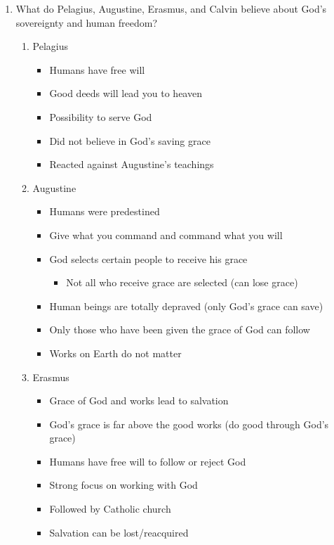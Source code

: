 \documentclass[8pt]{article}
\begin{document}
\begin{enumerate}
    \item What do Pelagius, Augustine, Erasmus, and Calvin believe about God's sovereignty and human freedom?
    \begin{enumerate}
        \item Pelagius
        \begin{itemize}
            \item Humans have free will
            \item Good deeds will lead you to heaven
            \item Possibility to serve God
            \item Did not believe in God's saving grace
            \item Reacted against Augustine's teachings
        \end{itemize}
        \item Augustine
        \begin{itemize}
            \item Humans were predestined
            \item Give what you command and command what you will
            \item God selects certain people to receive his grace
            \begin{itemize}
                \item Not all who receive grace are selected (can lose grace)
            \end{itemize}
            \item Human beings are totally depraved (only God's grace can save)
            \item Only those who have been given the grace of God can follow
            \item Works on Earth do not matter
        \end{itemize}
        \item Erasmus
        \begin{itemize}
            \item Grace of God and works lead to salvation
            \item God's grace is far above the good works (do good through God's grace)
            \item Humans have free will to follow or reject God
            \item Strong focus on working with God
            \item Followed by Catholic church
            \item Salvation can be lost/reacquired

\end{itemize}
\end{enumerate}
\end{enumerate}
\end{document}
